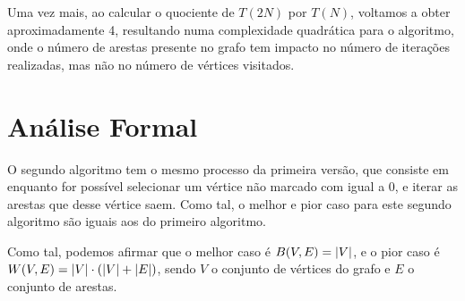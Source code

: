 Uma vez mais, ao calcular o quociente de $T(2N)$ por $T(N)$, voltamos a obter
aproximadamente 4, resultando numa complexidade quadrática para o algoritmo,
onde o número de arestas presente no grafo tem impacto no número de iterações
realizadas, mas não no número de vértices visitados.

\section{Análise Formal}

O segundo algoritmo tem o mesmo processo da primeira versão,
que consiste em enquanto for possível selecionar um vértice
não marcado com  igual a 0, e iterar as
arestas que desse vértice saem. Como tal, o melhor e pior
caso para este segundo algoritmo são iguais aos do primeiro
algoritmo.

Como tal, podemos afirmar que o melhor caso é $B(V, E) = \left\lvert V \right\rvert$,
e o pior caso é $W(V,E) = \left\lvert V \right\rvert \cdot \left(\left\lvert V \right\rvert + \left\lvert E \right\rvert\right)$,
sendo $V$ o conjunto de vértices do grafo e $E$ o conjunto de arestas.
